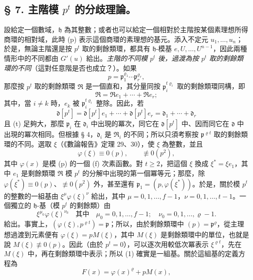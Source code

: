 \documentclass[11pt]{article}
\begin{document}
\subsection*{\S{} 7. 主階模 \(p^t\) 的分歧理論。}

設給定一個數域，\(\mathfrak h\) 為其整數；或者也可以給定一個相對於主階按某個素理想所得商環的相對域，此時 (p) 表示這個商環的素理想的基元。添入不定元 \(u_1,\ldots,u_n\)；於是，無論主階還是按 \(p^t\) 取的剩餘類環，都具有 \(\mathfrak h\)-模基 \(e,U,\ldots,U^{n-1}\)，因此兩種情形中的不同都由 \(G'(u)\) 給出。\emph{主階的不同模 \(p^t\) 後，過渡為按 \(p^t\) 取的剩餘類環的不同}（這對任意階是否也成立？）。如果
\[
p=\mathfrak p_1^{\varrho_1}\cdots\mathfrak p_r^{\varrho_r},
\]
那麼按 \(p^t\) 取的剩餘類環 \(\mathfrak R\) 是一個直和，其分量同按 \(\mathfrak p_i^{t\varrho_i}\) 取的剩餘類環同構，即
\[
\mathfrak R=\mathfrak R e_1+\cdots+\mathfrak R e_r;
\]
其中，當 \(i\ne k\) 時，\(e_k\) 被 \(\mathfrak p_i^{t\varrho_i}\) 整除。因此，若
\[
\mathfrak d[p^t]=\mathfrak d[p^t]e_1+\cdots+\mathfrak d[p^t]e_r
=\mathfrak d_1+\cdots+\mathfrak d_r
\]
且 (t) 足夠大，那麼 \(\mathfrak p_i\) 在 \(\mathfrak d_i\) 中出現的冪次，同它在 \(\mathfrak d[p^t]\) 中、因而同它在 \(\mathfrak d\) 中出現的冪次相同。但根據 § 4，\(\mathfrak d_i\) 是 \(\mathfrak R_i\) 的不同；所以只須考察按 \(\mathfrak p^{\varrho t}\) 取的剩餘類環的不同。選取 \(\xi\)（《數論報告》定理 29、30），使 \(\xi\) 為整數，並且
\[
\varphi(\xi)\equiv0(p),
\qquad \not\equiv0(p^2),
\]
其中 \(\varphi(x)\) 是模 (p) 的一個 (f) 次素函數。對 \(t\ge2\)，把這個 \(\xi\) 換成 \(\xi^*=\xi e_1\)，其中 \(e_1\) 是剩餘類環 \(\mathfrak R\) 模 \(p^t\) 的分解中出現的第一個冪等元；那麼，除 \(\varphi(\xi^*)\equiv0(p)\)、\(\not\equiv0(p^2)\) 外，甚至還有 \(\mathfrak p_1=(p,\varphi(\xi^*))\)。於是，關於模 \(p^t\) 的整數的一組基由 \(\xi^\mu\varphi(\xi)^\nu\) 給出，其中 \(\mu=0,1,\ldots,f-1\)，\(\nu=0,1,\ldots,t-1\)。一個獨立的 \(\mathfrak h\)-基（模 \(p^t\) 的剩餘類）由
\begin{equation}
\xi^{\mu_0}\varphi(\xi)^{\nu_0}
\quad\text{其中}\quad
\mu_0=0,1,\ldots,f-1;
\quad \nu_0=0,1,\ldots,\varrho-1. \tag{1}
\end{equation}
給出。事實上，\((\varphi(\xi),p^{\varrho t})=\mathfrak p\)；所以，由於剩餘類環中 \((p)=\mathfrak p^\varrho\)，從主理想過渡到元素便有 \(\varphi(\xi)=pM(\xi)\)，其中 \(M(\xi)\) 是剩餘類環中的單位，也就是說 \(M(\xi)\not\equiv0(p)\)。因此（由於 \(p^t=0\)），可以逐次用較低次冪表示 \(\xi^{\varrho t}\)，先在 \(M(\xi)\) 中，再在剩餘類環中表示；所以 (1) 確實是一組基。關於這組基的定義方程為
\[
F(x)=\varphi(x)^\varrho+pM(x),
\]
\end{document}
